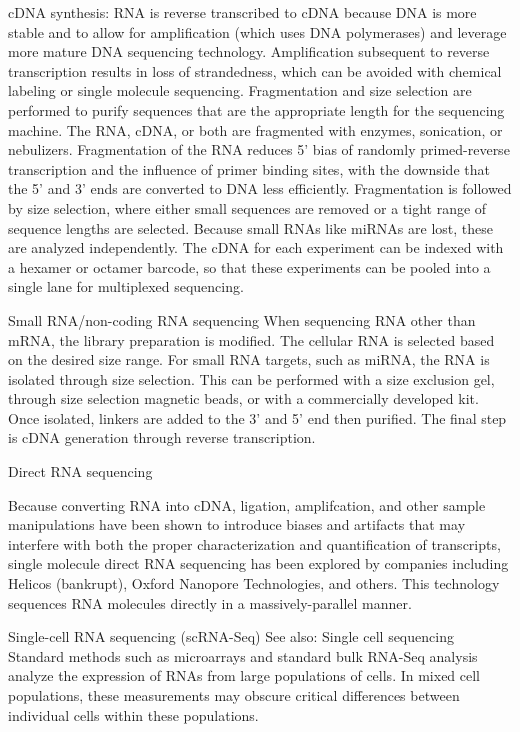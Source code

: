 \begin{enumerate}
  cDNA synthesis: RNA is reverse transcribed to cDNA because DNA is more stable and to allow for amplification (which uses DNA polymerases) and leverage more mature DNA sequencing technology. Amplification subsequent to reverse transcription results in loss of strandedness, which can be avoided with chemical labeling or single molecule sequencing. Fragmentation and size selection are performed to purify sequences that are the appropriate length for the sequencing machine. The RNA, cDNA, or both are fragmented with enzymes, sonication, or nebulizers. Fragmentation of the RNA reduces 5' bias of randomly primed-reverse transcription and the influence of primer binding sites, with the downside that the 5' and 3' ends are converted to DNA less efficiently. Fragmentation is followed by size selection, where either small sequences are removed or a tight range of sequence lengths are selected. Because small RNAs like miRNAs are lost, these are analyzed independently. The cDNA for each experiment can be indexed with a hexamer or octamer barcode, so that these experiments can be pooled into a single lane for multiplexed sequencing.
\end{enumerate}

Small RNA/non-coding RNA sequencing
When sequencing RNA other than mRNA, the library preparation is modified. The cellular RNA is selected based on the desired size range. For small RNA targets, such as miRNA, the RNA is isolated through size selection. This can be performed with a size exclusion gel, through size selection magnetic beads, or with a commercially developed kit. Once isolated, linkers are added to the 3' and 5' end then purified. The final step is cDNA generation through reverse transcription.

Direct RNA sequencing

Because converting RNA into cDNA, ligation, amplifcation, and other sample manipulations have been shown to introduce biases and artifacts that may interfere with both the proper characterization and quantification of transcripts, single molecule direct RNA sequencing has been explored by companies including Helicos (bankrupt), Oxford Nanopore Technologies, and others. This technology sequences RNA molecules directly in a massively-parallel manner.

Single-cell RNA sequencing (scRNA-Seq)
See also: Single cell sequencing
Standard methods such as microarrays and standard bulk RNA-Seq analysis analyze the expression of RNAs from large populations of cells. In mixed cell populations, these measurements may obscure critical differences between individual cells within these populations.

